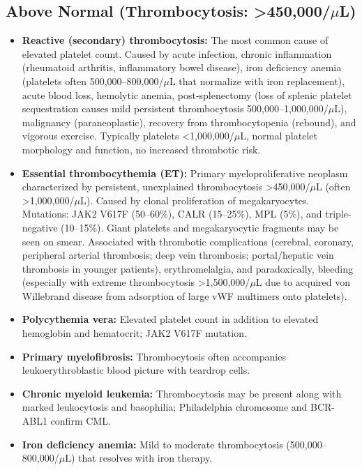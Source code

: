 \subsection*{Above Normal (Thrombocytosis: >450,000/$\mu$L)}
\begin{itemize}
  \item \textbf{Reactive (secondary) thrombocytosis:} The most common cause of elevated platelet count. Caused by acute infection, chronic inflammation (rheumatoid arthritis, inflammatory bowel disease), iron deficiency anemia (platelets often 500,000--800,000/$\mu$L that normalize with iron replacement), acute blood loss, hemolytic anemia, post-splenectomy (loss of splenic platelet sequestration causes mild persistent thrombocytosis 500,000--1,000,000/$\mu$L), malignancy (paraneoplastic), recovery from thrombocytopenia (rebound), and vigorous exercise. Typically platelets <1,000,000/$\mu$L, normal platelet morphology and function, no increased thrombotic risk.
  \item \textbf{Essential thrombocythemia (ET):} Primary myeloproliferative neoplasm characterized by persistent, unexplained thrombocytosis >450,000/$\mu$L (often >1,000,000/$\mu$L). Caused by clonal proliferation of megakaryocytes. Mutations: JAK2 V617F (50--60\%), CALR (15--25\%), MPL (5\%), and triple-negative (10--15\%). Giant platelets and megakaryocytic fragments may be seen on smear. Associated with thrombotic complications (cerebral, coronary, peripheral arterial thrombosis; deep vein thrombosis; portal/hepatic vein thrombosis in younger patients), erythromelalgia, and paradoxically, bleeding (especially with extreme thrombocytosis >1,500,000/$\mu$L due to acquired von Willebrand disease from adsorption of large vWF multimers onto platelets).
  \item \textbf{Polycythemia vera:} Elevated platelet count in addition to elevated hemoglobin and hematocrit; JAK2 V617F mutation.
  \item \textbf{Primary myelofibrosis:} Thrombocytosis often accompanies leukoerythroblastic blood picture with teardrop cells.
  \item \textbf{Chronic myeloid leukemia:} Thrombocytosis may be present along with marked leukocytosis and basophilia; Philadelphia chromosome and BCR-ABL1 confirm CML.
  \item \textbf{Iron deficiency anemia:} Mild to moderate thrombocytosis (500,000--800,000/$\mu$L) that resolves with iron therapy.
\end{itemize}

